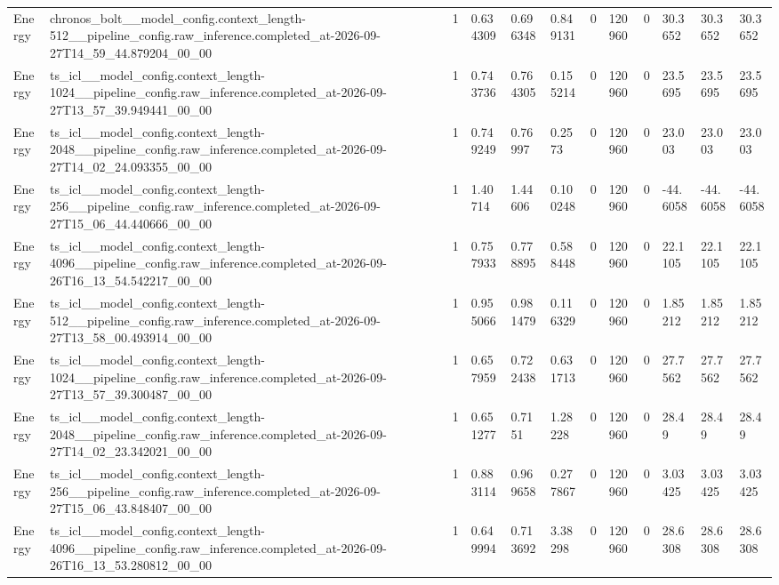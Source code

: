 \begin{tabular}{llllllllllll}
Energy & chronos\_bolt\_\_model\_config.context\_length-512\_\_pipeline\_config.raw\_inference.completed\_at-2026-09-27T14\_59\_44.879204\_00\_00 & 1 & 0.634309 & 0.696348 & 0.849131 & 0 & 120960 & 0 & 30.3652 & 30.3652 & 30.3652 \\
Energy & ts\_icl\_\_model\_config.context\_length-1024\_\_pipeline\_config.raw\_inference.completed\_at-2026-09-27T13\_57\_39.949441\_00\_00 & 1 & 0.743736 & 0.764305 & 0.155214 & 0 & 120960 & 0 & 23.5695 & 23.5695 & 23.5695 \\
Energy & ts\_icl\_\_model\_config.context\_length-2048\_\_pipeline\_config.raw\_inference.completed\_at-2026-09-27T14\_02\_24.093355\_00\_00 & 1 & 0.749249 & 0.76997 & 0.2573 & 0 & 120960 & 0 & 23.003 & 23.003 & 23.003 \\
Energy & ts\_icl\_\_model\_config.context\_length-256\_\_pipeline\_config.raw\_inference.completed\_at-2026-09-27T15\_06\_44.440666\_00\_00 & 1 & 1.40714 & 1.44606 & 0.100248 & 0 & 120960 & 0 & -44.6058 & -44.6058 & -44.6058 \\
Energy & ts\_icl\_\_model\_config.context\_length-4096\_\_pipeline\_config.raw\_inference.completed\_at-2026-09-26T16\_13\_54.542217\_00\_00 & 1 & 0.757933 & 0.778895 & 0.588448 & 0 & 120960 & 0 & 22.1105 & 22.1105 & 22.1105 \\
Energy & ts\_icl\_\_model\_config.context\_length-512\_\_pipeline\_config.raw\_inference.completed\_at-2026-09-27T13\_58\_00.493914\_00\_00 & 1 & 0.955066 & 0.981479 & 0.116329 & 0 & 120960 & 0 & 1.85212 & 1.85212 & 1.85212 \\
Energy & ts\_icl\_\_model\_config.context\_length-1024\_\_pipeline\_config.raw\_inference.completed\_at-2026-09-27T13\_57\_39.300487\_00\_00 & 1 & 0.657959 & 0.722438 & 0.631713 & 0 & 120960 & 0 & 27.7562 & 27.7562 & 27.7562 \\
Energy & ts\_icl\_\_model\_config.context\_length-2048\_\_pipeline\_config.raw\_inference.completed\_at-2026-09-27T14\_02\_23.342021\_00\_00 & 1 & 0.651277 & 0.7151 & 1.28228 & 0 & 120960 & 0 & 28.49 & 28.49 & 28.49 \\
Energy & ts\_icl\_\_model\_config.context\_length-256\_\_pipeline\_config.raw\_inference.completed\_at-2026-09-27T15\_06\_43.848407\_00\_00 & 1 & 0.883114 & 0.969658 & 0.277867 & 0 & 120960 & 0 & 3.03425 & 3.03425 & 3.03425 \\
Energy & ts\_icl\_\_model\_config.context\_length-4096\_\_pipeline\_config.raw\_inference.completed\_at-2026-09-26T16\_13\_53.280812\_00\_00 & 1 & 0.649994 & 0.713692 & 3.38298 & 0 & 120960 & 0 & 28.6308 & 28.6308 & 28.6308 \\

\end{tabular}
